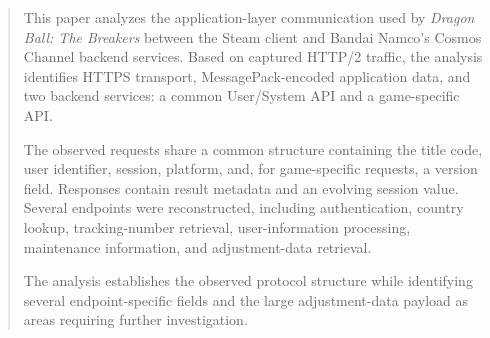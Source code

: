 

\maketitle

\begin{abstract}
This paper analyzes the application-layer communication used by \emph{Dragon Ball: The Breakers} between the Steam client and Bandai Namco's Cosmos Channel backend services. Based on captured HTTP/2 traffic, the analysis identifies HTTPS transport, MessagePack-encoded application data, and two backend services: a common User/System API and a game-specific API.

The observed requests share a common structure containing the title code, user identifier, session, platform, and, for game-specific requests, a version field. Responses contain result metadata and an evolving session value. Several endpoints were reconstructed, including authentication, country lookup, tracking-number retrieval, user-information processing, maintenance information, and adjustment-data retrieval.

The analysis establishes the observed protocol structure while identifying several endpoint-specific fields and the large adjustment-data payload as areas requiring further investigation.
\end{abstract}

\newpage